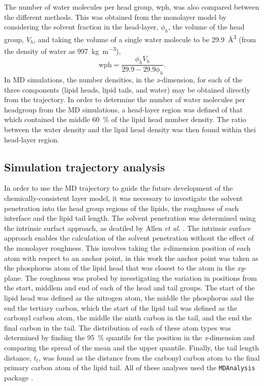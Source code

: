 The number of water molecules per head group, wph, was also compared between the different methods.
This was obtained from the monolayer model by considering the solvent fraction in the head-layer, $\phi_h$, the volume of the head group, $V_h$, and taking the volume of a single water molecule to be \SI{29.9}{\angstrom\cubed} (from the density of water as \SI{997}{\kg\per\meter\cubed}),
%
\begin{equation}
\text{wph}=\frac{\phi_h V_h}{29.9 - 29.9\phi_h}.
\label{equ:wph}
\end{equation}
%
In MD simulations, the number densities, in the \emph{z}-dimension, for each of the three components (lipid heads, lipid tails, and water) may be obtained directly from the trajectory.
In order to determine the number of water molecules per headgroup from the MD simulations, a head-layer region was defined of that which contained the middle \SI{60}{\percent} of the lipid head number density.
The ratio between the water density and the lipid head density was then found within thei head-layer region.

\subsection{Simulation trajectory analysis}
\label{sec:traj}
In order to use the MD trajectory to guide the future development of the chemically-consistent layer model, it was necessary to investigate the solvent penetration into the head group regions of the lipids, the roughness of each interface and the lipid tail length.
The solvent penetration was determined using the intrinsic surfact approach, as deatiled by Allen \emph{et al.} \cite{allen_specific_2016,pandit_algorithm_2003}.
The intrinsic surface approach enables the calculation of the solvent penetration without the effect of the monolayer roughness.
This involves taking the \emph{z}-dimension position of each atom with respect to an anchor point, in this work the anchor point was taken as the phosphorus atom of the lipid head that was closest to the atom in the \emph{xy}-plane.
The roughness was probed by investigating the variation in positions from the start, middlem and end of each of the head and tail groups.
The start of the lipid head was defined as the nitrogen atom, the middle the phosphorus and the end the tertiary carbon, which the start of the lipid tail was defined as the carbonyl carbon atom, the middle the ninth carbon in the tail, and the end the final carbon in the tail.
The distribution of each of these atom types was determined by finding the \SI{95}{\percent} quantile for the position in the \emph{z}-dimension and comparing the spread of the mean and the upper quantile.
Finally, the tail length distance, $t_t$, was found as the distance from the carbonyl carbon atom to the final primary carbon atom of the lipid tail.
All of these analyses used the \texttt{MDAnalysis} package \cite{gowers_mdanalysis_2016,michaud-agrawal_mdanalysis_2011}.
